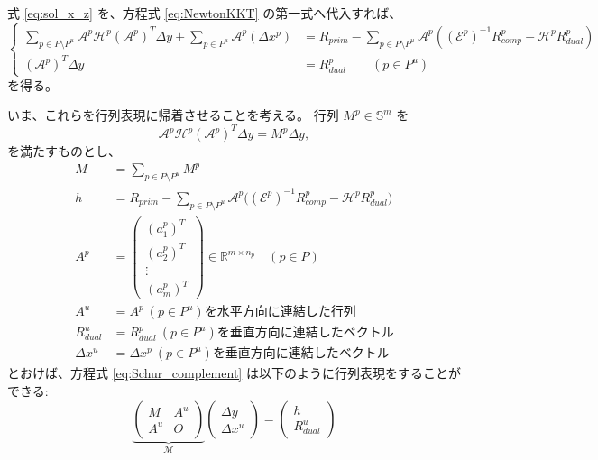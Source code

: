 \documentclass{jsarticle}
\begin{document}
式 \eqref{eq:sol_x_z} を、方程式 \eqref{eq:NewtonKKT} の第一式へ代入すれば、
\begin{equation}
    \left\{
    \begin{aligned}
        \sum_{p \in P\setminus P^u} \mathcal{A}^p\mathcal{H}^p(\mathcal{A}^p)^T\Delta y + \sum_{p \in P^u} \mathcal{A}^p(\Delta x^p) 
            &= R_{prim} - \sum_{p \in P\setminus P^u} \mathcal{A}^p((\mathcal{E}^p)^{-1}R_{comp}^p - \mathcal{H}^p R_{dual}^p) \\
        (\mathcal{A}^p)^T \Delta y 
            &= R^p_{dual} \qquad (p\in P^u)
    \end{aligned}
    \right.
    \label{eq:Schur_complement}
\end{equation}
を得る。

いま、これらを行列表現に帰着させることを考える。
行列 $M^p\in\mathbb{S}^{m}$ を
\begin{equation*}
    \mathcal{A}^p\mathcal{H}^p(\mathcal{A}^p)^T \Delta y= M^p \Delta y,
\end{equation*}
を満たすものとし、
\begin{align*}
    M &= \sum_{p \in P \setminus P^u} M^p \\ %
    h &= R_{prim} - \sum_{p \in P \setminus P^u} \mathcal{A}^p\big((\mathcal{E}^p)^{-1}R_{comp}^p - \mathcal{H}^p R_{dual}^p\big)\\
    A^p &= \begin{pmatrix}
        (a^p_1)^T\\
        (a^p_2)^T\\
        \vdots\\
        (a^p_m)^T
    \end{pmatrix} \in \mathbb{R}^{m\times n_p} \quad (p\in P)\\
    A^u &= A^p ~ (p\in P^u)\text{を水平方向に連結した行列}\\
    R^u_{dual} &= R^p_{dual} ~ (p\in P^u)\text{を垂直方向に連結したベクトル}\\
    \Delta x^u &= \Delta x^p ~ (p\in P^u)\text{を垂直方向に連結したベクトル}
\end{align*}
とおけば、方程式 \eqref{eq:Schur_complement} は以下のように行列表現をすることができる:
\begin{equation}
    \underbrace{\left(\begin{array}{cc}
        M   & A^u \\
        A^u & O
    \end{array}\right)}_{\mathcal{M}}
    \left(\begin{array}{c}
        \Delta y   \\
        \Delta x^u 
    \end{array}\right) 
    = 
    \left(\begin{array}{c}
         h  \\
         R_{dual}^u 
    \end{array}
    \right)
    \label{eq:Schur_complement_Mat}
\end{equation}
\end{document}
